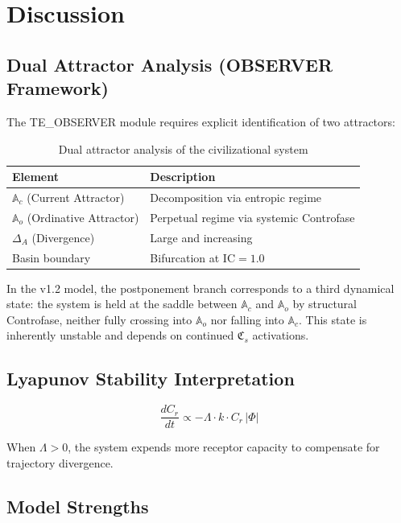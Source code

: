 \documentclass[12pt,a4paper]{article}
\newcommand{\reag}{C_r}
\newcommand{\IC}{\mathrm{IC}}
\newcommand{\CFs}{\mathfrak{C}_s}        %
\newcommand{\Ac}{\mathbb{A}_c}          %
\newcommand{\Ao}{\mathbb{A}_o}          %
\begin{document}
\section{Discussion}\label{sec:discussion}

\subsection{Dual Attractor Analysis (OBSERVER Framework)}

The TE\_OBSERVER module \cite{observer} requires explicit identification of two attractors:

\begin{table}[H]
\centering
\caption{Dual attractor analysis of the civilizational system}
\label{tab:dual_attractor}
\begin{tabular}{@{}ll@{}}
\toprule
\textbf{Element} & \textbf{Description} \\
\midrule
$\Ac$ (Current Attractor) & Decomposition via entropic regime \\
$\Ao$ (Ordinative Attractor) & Perpetual regime via systemic Controfase \\
$\Delta_A$ (Divergence) & Large and increasing \\
Basin boundary & Bifurcation at $\IC = 1.0$ \\
\bottomrule
\end{tabular}
\end{table}

In the v1.2 model, the postponement branch corresponds to a third dynamical state: the system is held at the saddle between $\Ac$ and $\Ao$ by structural Controfase, neither fully crossing into $\Ao$ nor falling into $\Ac$. This state is inherently unstable and depends on continued $\CFs$ activations.

\subsection{Lyapunov Stability Interpretation}

\begin{equation}
\frac{d\reag}{dt} \propto -\Lambda \cdot k \cdot \reag\,|\Phi|
\end{equation}

When $\Lambda > 0$, the system expends more receptor capacity to compensate for trajectory divergence.

\subsection{Model Strengths}
\end{document}
